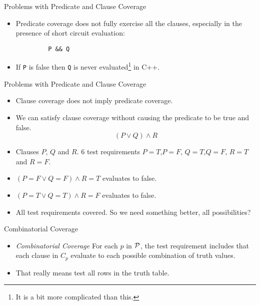\documentclass{beamer}
\newcommand{\predset}{{\cal P}}
\begin{document}
\begin{frame}[fragile]{Problems with Predicate and Clause Coverage} 
  \begin{itemize}
  \item Predicate coverage does not fully exercise all the clauses,
    especially in the presence of short circuit evaluation:
    \begin{center}
      \begin{verbatim}
         P && Q
      \end{verbatim}
    \end{center}
  \item If \verb+P+ is false then \verb+Q+ is never
    evaluated\footnote{It is a bit more complicated than this.} in C++.
  \end{itemize}
  
\end{frame}
\begin{frame}[fragile]{Problems with Predicate and Clause Coverage} 
  \begin{itemize}
  \item Clause coverage does not imply predicate coverage.
  \item We can satisfy clause coverage without causing the predicate
    to be  true and false.
    \[
     (P \lor Q) \land R
    \]
    \item Clauses $P$, $Q$ and $R$. 6 test requirements $P=T$,$P=F$,
    $Q=T$,$Q=F$, $R=T$ and $R=F$.
  \item $(P=F \lor Q=F)    \land R=T$ evaluates to false.
  \item $(P=T \lor Q=T)    \land R=F$ evaluates to false.
  \item All test requirements covered.  So we need something better,
    all possibilities?
  \end{itemize}  
\end{frame}
\begin{frame}{Combinatorial Coverage}
  \begin{itemize}
  \item {\em Combinatorial Coverage} For each $p$ in $\predset$, the
    test requirement includes that each clause in $C_p$ evaluate to
    each possible combination of truth values.
  \item That really means test all rows in the truth table. 

  \end{itemize}
\end{frame}
\end{document}
